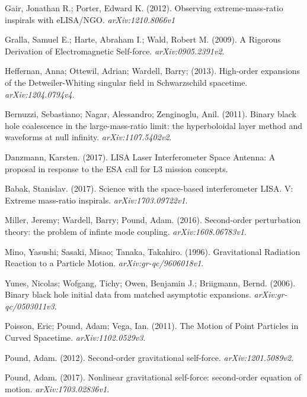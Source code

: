 Gair, Jonathan R.; Porter, Edward K. (2012). Observing extreme-mass-ratio inspirals with eLISA/NGO. {\em arXiv:1210.8066v1}

Gralla, Samuel E.; Harte, Abraham I.; Wald, Robert M. (2009). A Rigorous Derivation of Electromagnetic Self-force. {\em arXiv:0905.2391v2}.

Heffernan, Anna; Ottewil, Adrian; Wardell, Barry; (2013). High-order expansions of the Detweiler-Whiting singular field in Schwarzschild spacetime. {\em arXiv:1204.0794v4}.

Bernuzzi, Sebastiano; Nagar, Alessandro; Zenginoglu, Anil. (2011). Binary black hole coalescence in the large-mass-ratio limit: the hyperboloidal layer method and waveforms at null infinity. {\em arXiv:1107.5402v2}.

Danzmann, Karsten. (2017). LISA Laser Interferometer Space Antenna: A proposal in response to the ESA call for L3 mission concepts. 

Babak, Stanislav. (2017). Science with the space-based interferometer LISA. V: Extreme mass-ratio inspirals. {\em arXiv:1703.09722v1}.

Miller, Jeremy; Wardell, Barry; Pound, Adam. (2016). Second-order perturbation theory: the problem of infinte mode coupling. {\em arXiv:1608.06783v1}.

Mino, Yasushi; Sasaki, Misao; Tanaka, Takahiro. (1996). Gravitational Radiation Reaction to a Particle Motion. {\em arXiv:gr-qc/9606018v1}.

Yunes, Nicolas; Wofgang, Tichy; Owen, Benjamin J.; Briigmann, Bernd. (2006). Binary black hole initial data from matched asymptotic expansions. {\em arXiv:gr-qc/0503011v3}.

Poisson, Eric; Pound, Adam; Vega, Ian. (2011). The Motion of Point Particles in Curved Spacetime. {\em arXiv:1102.0529v3}.

Pound, Adam. (2012). Second-order gravitational self-force. {\em arXiv:1201.5089v2}.

Pound, Adam. (2017). Nonlinear gravitational self-force: second-order equation of motion. {\em arXiv:1703.02836v1}.

